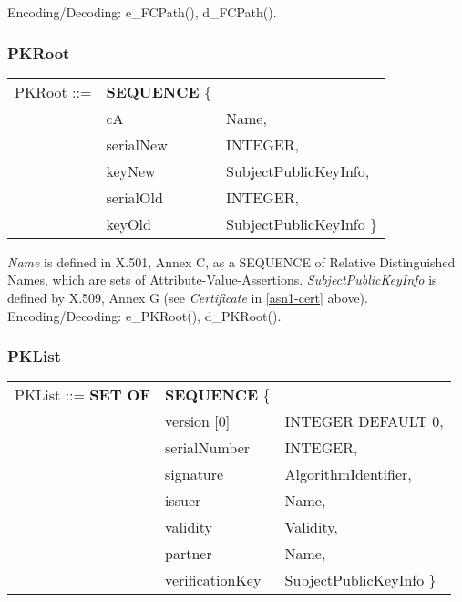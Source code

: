Encoding/Decoding: e\_FCPath(), d\_FCPath().

\subsubsection{PKRoot}
\label{asn1-PKRoot}

{\small
\begin {center}
\begin {tabular}{lll}
PKRoot ::= & {\bf SEQUENCE} \{ &    \\
  & cA                & Name,                 \\
  & serialNew         & INTEGER,              \\
  & keyNew            & SubjectPublicKeyInfo, \\
  & serialOld         & INTEGER,              \\
  & keyOld            & SubjectPublicKeyInfo \}
\end {tabular}
\end {center}
}
 
{\em Name} is defined in X.501, Annex C,
as a SEQUENCE of Relative Distinguished Names,
which are sets of Attribute-Value-Assertions.
{\em SubjectPublicKeyInfo} is defined by X.509, Annex G
(see {\em Certificate} in \ref{asn1-cert} above).
\\[1ex]
Encoding/Decoding: e\_PKRoot(), d\_PKRoot().

\subsubsection{PKList}
\label{asn1-PKList}

{\small
\begin {center}
\begin {tabular}{lll}
PKList ::= {\bf SET OF} & {\bf SEQUENCE} \{ & \\
 & version [0]     & INTEGER DEFAULT 0,       \\
 & serialNumber    & INTEGER,                 \\
 & signature       & AlgorithmIdentifier,     \\
 & issuer          & Name,                    \\
 & validity        & Validity,                \\
 & partner         & Name,                    \\
 & verificationKey & SubjectPublicKeyInfo \}
\end {tabular}
\end {center}
}
 
